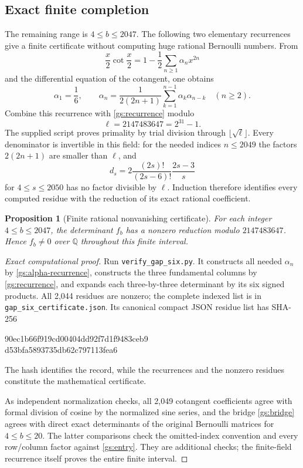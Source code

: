 \documentclass[11pt,a4paper]{article}
\newtheorem{proposition}[theorem]{Proposition}
\theoremstyle{definition}
\theoremstyle{remark}
\numberwithin{equation}{section}
\begin{document}
\subsection{Exact finite completion}

The remaining range is $4\le b\le2047$.
The following two elementary recurrences give a finite certificate
without computing huge rational Bernoulli numbers.  From
\[
 \frac{x}{2}\cot\frac{x}{2}=1-\frac12\sum_{n\ge1}\alpha_nx^{2n}
\]
and the differential equation of the cotangent, one obtains
\begin{equation}\label{gs:alpha-recurrence}
 \alpha_1=\frac16,\qquad
 \alpha_n=\frac1{2(2n+1)}
       \sum_{k=1}^{n-1}\alpha_k\alpha_{n-k}\quad(n\ge2).
\end{equation}
Combine this recurrence with \eqref{gs:recurrence} modulo
\[
                         \ell=2147483647=2^{31}-1.
\]
The supplied script proves primality by trial division through
$\lfloor\sqrt\ell\rfloor$.  Every denominator is invertible in
this field: for the needed indices $n\le2049$ the factors
$2(2n+1)$ are smaller than $\ell$, and
\[
 d_s=2\frac{(2s)!}{(2s-6)!}\frac{2s-3}{s}
\]
for $4\le s\le2050$ has no factor divisible by $\ell$.
Induction therefore identifies every computed residue with the
reduction of its exact rational coefficient.

\begin{proposition}[Finite rational nonvanishing certificate]
\label{gs:finite}
For each integer $4\le b\le2047$, the determinant $f_b$ has a
nonzero reduction modulo $2147483647$.  Hence $f_b\ne0$ over
$\mathbb Q$ throughout this finite interval.
\end{proposition}

\begin{proof}[Exact computational proof]
Run \texttt{verify\_gap\_six.py}.  It constructs all needed
$\alpha_n$ by \eqref{gs:alpha-recurrence}, constructs the three
fundamental columns by \eqref{gs:recurrence}, and expands each
three-by-three determinant by its six signed products.  All 2,044
residues are nonzero; the complete indexed list is in
\texttt{gap\_six\_certificate.json}.  Its canonical compact JSON
residue list has SHA-256
\begin{center}\small\ttfamily
90ec1b66f919cd00404dd92f7d1f9483ceb9\\
d53bfa5893735db62c797113fea6
\end{center}
The hash identifies the record, while the recurrences and the nonzero
residues constitute the mathematical certificate.

As independent normalization checks, all 2,049 cotangent coefficients
agree with formal division of cosine by the normalized sine series,
and the bridge \eqref{gs:bridge} agrees with direct exact determinants
of the original Bernoulli matrices for $4\le b\le20$.  The latter
comparisons check the omitted-index convention and every row/column
factor against \eqref{gs:entry}.  They are additional checks; the
finite-field recurrence itself proves the entire finite interval.
\end{proof}
\end{document}

